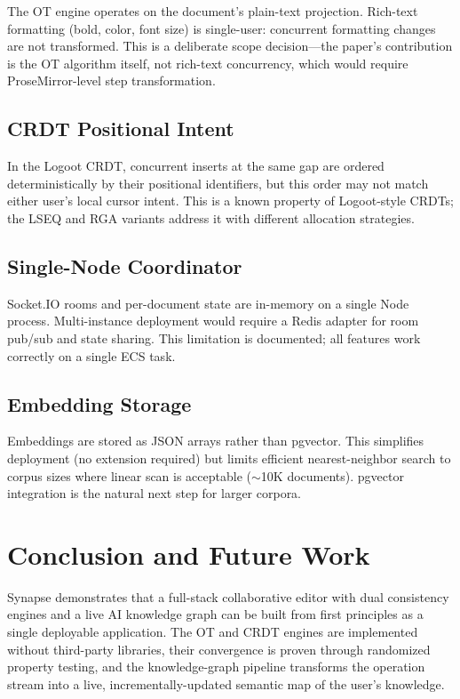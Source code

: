 \documentclass[conference]{IEEEtran}
\begin{document}
The OT engine operates on the document's plain-text projection. Rich-text formatting (bold, color, font size) is single-user: concurrent formatting changes are not transformed. This is a deliberate scope decision---the paper's contribution is the OT algorithm itself, not rich-text concurrency, which would require ProseMirror-level step transformation.

\subsection{CRDT Positional Intent}

In the Logoot CRDT, concurrent inserts at the same gap are ordered deterministically by their positional identifiers, but this order may not match either user's local cursor intent. This is a known property of Logoot-style CRDTs; the LSEQ and RGA variants address it with different allocation strategies.

\subsection{Single-Node Coordinator}

Socket.IO rooms and per-document state are in-memory on a single Node process. Multi-instance deployment would require a Redis adapter for room pub/sub and state sharing. This limitation is documented; all features work correctly on a single ECS task.

\subsection{Embedding Storage}

Embeddings are stored as JSON arrays rather than pgvector. This simplifies deployment (no extension required) but limits efficient nearest-neighbor search to corpus sizes where linear scan is acceptable ($\sim$10K documents). pgvector integration is the natural next step for larger corpora.

\section{Conclusion and Future Work}\label{sec:conclusion}

Synapse demonstrates that a full-stack collaborative editor with dual consistency engines and a live AI knowledge graph can be built from first principles as a single deployable application. The OT and CRDT engines are implemented without third-party libraries, their convergence is proven through randomized property testing, and the knowledge-graph pipeline transforms the operation stream into a live, incrementally-updated semantic map of the user's knowledge.
\end{document}
